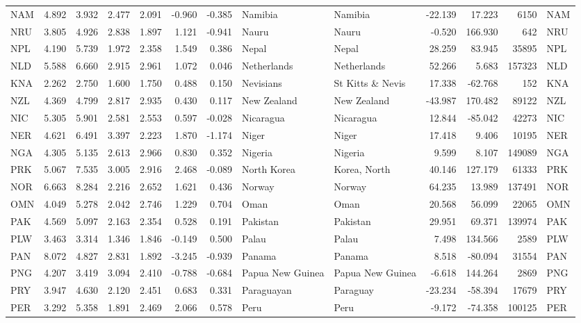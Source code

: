 \begin{tabular}{lrrrrrrllrrrl}
NAM & 4.892 & 3.932 & 2.477 & 2.091 & -0.960 & -0.385 & Namibia & Namibia & -22.139 & 17.223 & 6150 & NAM \\
NRU & 3.805 & 4.926 & 2.838 & 1.897 & 1.121 & -0.941 & Nauru & Nauru & -0.520 & 166.930 & 642 & NRU \\
NPL & 4.190 & 5.739 & 1.972 & 2.358 & 1.549 & 0.386 & Nepal & Nepal & 28.259 & 83.945 & 35895 & NPL \\
NLD & 5.588 & 6.660 & 2.915 & 2.961 & 1.072 & 0.046 & Netherlands & Netherlands & 52.266 & 5.683 & 157323 & NLD \\
KNA & 2.262 & 2.750 & 1.600 & 1.750 & 0.488 & 0.150 & Nevisians & St Kitts \& Nevis & 17.338 & -62.768 & 152 & KNA \\
NZL & 4.369 & 4.799 & 2.817 & 2.935 & 0.430 & 0.117 & New Zealand & New Zealand & -43.987 & 170.482 & 89122 & NZL \\
NIC & 5.305 & 5.901 & 2.581 & 2.553 & 0.597 & -0.028 & Nicaragua & Nicaragua & 12.844 & -85.042 & 42273 & NIC \\
NER & 4.621 & 6.491 & 3.397 & 2.223 & 1.870 & -1.174 & Niger & Niger & 17.418 & 9.406 & 10195 & NER \\
NGA & 4.305 & 5.135 & 2.613 & 2.966 & 0.830 & 0.352 & Nigeria & Nigeria & 9.599 & 8.107 & 149089 & NGA \\
PRK & 5.067 & 7.535 & 3.005 & 2.916 & 2.468 & -0.089 & North Korea & Korea, North & 40.146 & 127.179 & 61333 & PRK \\
NOR & 6.663 & 8.284 & 2.216 & 2.652 & 1.621 & 0.436 & Norway & Norway & 64.235 & 13.989 & 137491 & NOR \\
OMN & 4.049 & 5.278 & 2.042 & 2.746 & 1.229 & 0.704 & Oman & Oman & 20.568 & 56.099 & 22065 & OMN \\
PAK & 4.569 & 5.097 & 2.163 & 2.354 & 0.528 & 0.191 & Pakistan & Pakistan & 29.951 & 69.371 & 139974 & PAK \\
PLW & 3.463 & 3.314 & 1.346 & 1.846 & -0.149 & 0.500 & Palau & Palau & 7.498 & 134.566 & 2589 & PLW \\
PAN & 8.072 & 4.827 & 2.831 & 1.892 & -3.245 & -0.939 & Panama & Panama & 8.518 & -80.094 & 31554 & PAN \\
PNG & 4.207 & 3.419 & 3.094 & 2.410 & -0.788 & -0.684 & Papua New Guinea & Papua New Guinea & -6.618 & 144.264 & 2869 & PNG \\
PRY & 3.947 & 4.630 & 2.120 & 2.451 & 0.683 & 0.331 & Paraguayan & Paraguay & -23.234 & -58.394 & 17679 & PRY \\
PER & 3.292 & 5.358 & 1.891 & 2.469 & 2.066 & 0.578 & Peru & Peru & -9.172 & -74.358 & 100125 & PER \\

\end{tabular}
